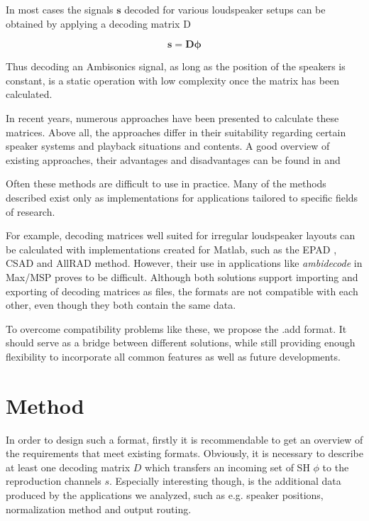 \documentclass[a4paper, 10pt, twocolumn]{article}
\begin{document}
In most cases the signals $\boldsymbol{s}$ decoded for various loudspeaker setups can be obtained by applying a decoding matrix D

\begin{equation}
    \boldsymbol{s}=\boldsymbol{D} \boldsymbol{\phi}
\end{equation}

Thus decoding an Ambisonics signal, as long as the position of the speakers is constant, is a static operation with low complexity once the matrix has been calculated.

In recent years, numerous approaches have been presented to calculate these matrices. Above all, the approaches differ in their suitability regarding certain speaker systems and playback situations and contents. A good overview of existing approaches, their advantages and disadvantages can be found in \cite{allradepadcomp} and \cite{unstablemmd}

Often these methods are difficult to use in practice. Many of the methods described exist only as implementations for applications tailored to specific fields of research. 

For example, decoding matrices well suited for irregular loudspeaker layouts can be calculated with implementations created for Matlab, such as the EPAD \cite{epad}, CSAD \cite{csad} and AllRAD \cite{allrad} method. However, their use in applications like \textit{ambidecode\texttildelow} \cite{ICSTAmbiPaper} in Max/MSP proves to be difficult. Although both solutions support importing and exporting of decoding matrices as files, the formats are not compatible with each other, even though they both contain the same data.

To overcome compatibility problems like these, we propose the .add format. It should serve as a bridge between different solutions, while still providing enough flexibility to incorporate all common features as well as future developments.

\section{Method} \label{sec:Method}

In order to design such a format, firstly it is recommendable to get an overview of the requirements that meet existing formats. Obviously, it is necessary to describe at least one decoding matrix $ D $ which transfers an incoming set of SH $ \phi $ to the reproduction channels $ s $. Especially interesting though, is the additional data produced by the applications we analyzed, such as e.g. speaker positions, normalization method and output routing.
\end{document}
